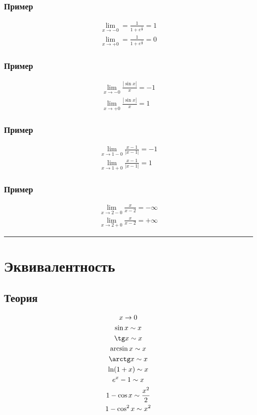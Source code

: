 \documentclass{article}
\begin{document}
\subsubsection{Пример}
\begin{gather*}
    \lim_{x \to -0} = \frac{1}{1 + e^{\frac{1}{x}}} = 1 \\
    \lim_{x \to +0} = \frac{1}{1 + e^\frac{1}{x}} = 0
\end{gather*}

\subsubsection{Пример}
\begin{gather*}
    \lim_{x \to -0} \frac{|\sin x|}{x} = -1 \\
    \lim_{x \to +0} \frac{|\sin x|}{x} = 1
\end{gather*}

\subsubsection{Пример}
\begin{gather*}
    \lim_{x \to 1 - 0} \frac{x - 1}{|x - 1|} = -1 \\
    \lim_{x \to 1 + 0} \frac{x - 1}{|x - 1|} = 1
\end{gather*}

\subsubsection{Пример}
\begin{gather*}
    \lim_{x \to 2 - 0} \frac{x}{x - 2} = -\infty \\
    \lim_{x \to 2 + 0} \frac{x}{x - 2} = +\infty
\end{gather*}



\par\noindent\rule{\textwidth}{1pt}
\section{Эквивалентность}

\subsection{Теория}
\begin{gather*}
    x \to 0 \\
    \sin x       \sim x \\
    \tg x        \sim x \\
    \arcsin x    \sim x \\
    \arctg x     \sim x \\
    \ln(1 + x)   \sim x \\
    e^x - 1      \sim x \\
    1 - \cos x   \sim \frac{x^2}{2} \\
    1 - \cos^2 x \sim x^2
\end{gather*}
\end{document}
